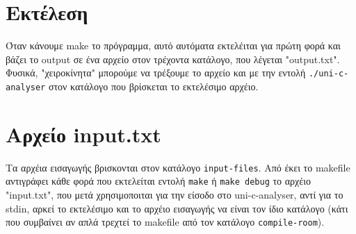\documentclass[14pt]{extarticle}
\begin{document}
\section{Εκτέλεση}
Όταν κάνουμε make το πρόγραμμα, αυτό αυτόματα εκτελέιται για πρώτη φορά και βάζει
το output σε ένα αρχείο στον τρέχοντα κατάλογο, που λέγεται "output.txt". 
\\
Φυσικά, "χειροκίνητα"
μπορούμε να τρέξουμε το αρχείο και με την εντολή \texttt{./uni-c-analyser} στον κατάλογο που βρίσκεται
το εκτελέσιμο αρχέιο.
\section{Αρχείο input.txt}
Τα αρχέια εισαγωγής βρισκονται στον κατάλογο \texttt{input-files}. 
Από έκει το makefile αντιγράφει κάθε φορά που εκτελείται εντολή \texttt{make} ή 
\texttt{make debug} το αρχέιο "input.txt", που μετά χρησιμοποιται για την είσοδο στο uni-c-analyser, αντί
για το stdin, αρκεί το εκτελέσιμο και το αρχέιο εισαγωγής να είναι τον ίδιο κατάλογο
(κάτι που συμβαίνει αν απλά τρεχτεί το makefile από τον κατάλογο \texttt{compile-room}).
\clearpage
\end{document}
